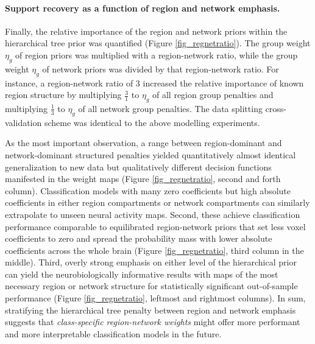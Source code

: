 \documentclass{article}
\begin{document}
\paragraph{Support recovery as a function of region and network emphasis.}
Finally, the relative importance of the
region and network priors within the hierarchical tree prior
was quantified (Figure \ref{fig_regnetratio}).
The group weight $\eta_g$ of region priors was multiplied with a
region-network ratio, while the
group weight $\eta_g$ of network priors was divided by that
region-network ratio. For instance, a region-network ratio of 3
increased the relative importance of known region structure
by multiplying $\frac{3}{1}$ to
$\eta_g$ of all region group penalties
and multiplying
$\frac{1}{3}$ to $\eta_g$ of all network group penalties.
The data splitting cross-validation scheme was identical to the
above modelling experiments.


As the most important observation,
a range between region-dominant and network-dominant structured penalties
yielded quantitatively almost identical generalization to new data
but qualitatively different decision functions manifested in the weight maps
(Figure \ref{fig_regnetratio}, second and forth column).
Classification models with many zero coefficients but high absolute
coefficients in either region compartments or network compartments
can similarly extrapolate to unseen neural activity maps.
Second,
these achieve classification performance
comparable to equilibrated region-network priors
that set less voxel coefficients to zero and spread the
probability mass with lower absolute coefficients across the whole brain
(Figure \ref{fig_regnetratio}, third column in the middle).
Third,
overly strong emphasis on either level of the hierarchical prior
can yield the neurobiologically informative results with maps
of the most necessary region or network structure for
statistically significant out-of-sample performance
(Figure \ref{fig_regnetratio}, leftmost and rightmost columns).
%
In sum,
stratifying the hierarchical tree penalty between region and network emphasis
suggests that \textit{class-specific region-network weights}
might offer more performant and more interpretable classification models
in the future.
\end{document}
